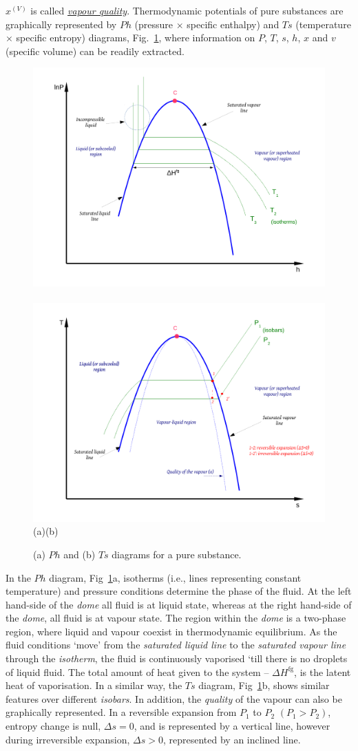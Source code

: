 \documentclass[12pts,a4paper,amsmath,amssymb,floatfix]{article}%
\newcommand{\mfr}[3][error]{#1_{#2}^{\left(#3\right)}}
\begin{document}
$\mfr[x]{}{V}$ is called \underline{\it vapour quality}. Thermodynamic potentials of pure substances are graphically represented by $Ph$ (pressure $\times$ specific enthalpy) and $Ts$ (temperature $\times$ specific entropy) diagrams, Fig.~\ref{Mod03Fig02}, where information on $P$, $T$, $s$, $h$, $x$ and $v$ (specific volume) can be readily extracted.
%
           \begin{figure}[h]
              \vbox{
                    \hbox{\includegraphics[width=.5\columnwidth,clip]{./Figs/Mod3PHDiagram}
                          \includegraphics[width=.5\columnwidth,clip]{./Figs/Mod3TSDiagram}}
                    \vspace{-.1cm}
                    \hbox{\hspace{4cm}(a)\hspace{8cm}(b)}}
              \caption{ (a) $Ph$ and (b) $Ts$ diagrams for a pure substance.}\label{Mod03Fig02}
           \end{figure}
%
In the $Ph$ diagram, Fig~\ref{Mod03Fig02}a, isotherms (i.e., lines representing constant temperature) and pressure conditions determine the phase of the fluid. At the left hand-side of the {\it dome} all fluid is at liquid state, whereas at the right hand-side of the {\it dome}, all fluid is at vapour state. The region within the {\it dome} is a two-phase region, where liquid and vapour coexist in thermodynamic equilibrium. As the fluid conditions `move' from the {\it saturated liquid line} to the {\it saturated vapour line} through the {\it isotherm}, the fluid is continuously vaporised `till there is no droplets of liquid fluid. The total amount of heat given to the system -- $\Delta H^{\text{fg}}$, is the latent heat of vaporisation. In a similar way, the $Ts$ diagram, Fig~\ref{Mod03Fig02}b, shows similar features over different {\it isobars}. In addition, the {\it quality} of the vapour can also be graphically represented. In a reversible expansion from $P_{1}$ to $P_{2}$ $\left(P_{1}>P_{2}\right)$, entropy change is null, $\Delta s=0$, and is represented by a vertical line, however during irreversible expansion, $\Delta s >0$, represented by an inclined line.  
\end{document}
